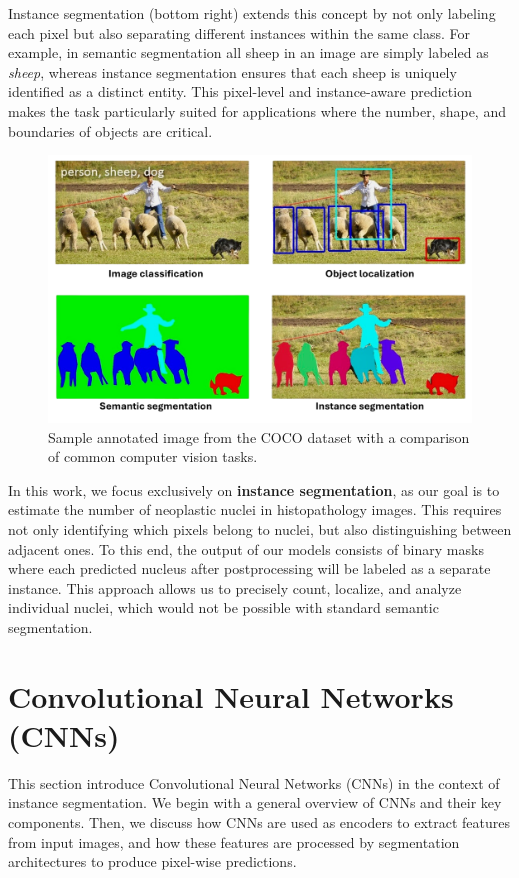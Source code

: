 \documentclass[target=bach,aauheader=,style=]{thud}
\begin{document}
Instance segmentation (bottom right) extends this concept by not only labeling each pixel but also separating different instances within the same class. For example, in semantic segmentation all sheep in an image are simply labeled as \textit{sheep}, whereas instance segmentation ensures that each sheep is uniquely identified as a distinct entity. This pixel-level and instance-aware prediction makes the task particularly suited for applications where the number, shape, and boundaries of objects are critical.  

\begin{figure}[h]
    \centering
    \includegraphics[width=0.75\linewidth]{imgs/Instance segmentation.png}
    \caption{Sample annotated image from the COCO \cite{lin2015microsoftcococommonobjects} dataset with a comparison of common computer vision tasks.}
    \label{fig:semantic}
\end{figure}

In this work, we focus exclusively on \textbf{instance segmentation}, as our goal is to estimate the number of neoplastic nuclei in histopathology images. This requires not only identifying which pixels belong to nuclei, but also distinguishing between adjacent ones. To this end, the output of our models consists of binary masks where each predicted nucleus after postprocessing will be labeled as a separate instance. This approach allows us to precisely count, localize, and analyze individual nuclei, which would not be possible with standard semantic segmentation.
\section{Convolutional Neural Networks (CNNs)}
This section introduce Convolutional Neural Networks (CNNs) in the context of instance segmentation. We begin with a general overview of CNNs and their key components. Then, we discuss how CNNs are used as encoders to extract features from input images, and how these features are processed by segmentation architectures to produce pixel-wise predictions.
\end{document}
